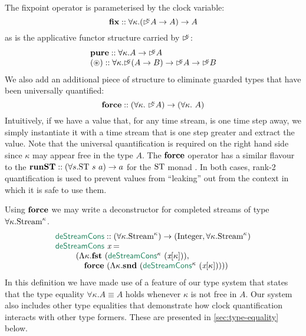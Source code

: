 The fixpoint operator is parameterised by the clock variable:
\begin{displaymath}
  \textbf{fix} :: \forall \kappa. (\mathord{\rhd\kern-0.4em^{\kappa}} A \to A) \to A
\end{displaymath}
as is the applicative functor structure carried by $\mathord{\rhd\kern-0.4em^{\kappa}}$:
\begin{displaymath}
  \begin{array}{l}
    \textbf{pure} :: \forall \kappa. A \to \mathord{\rhd\kern-0.4em^{\kappa}} A \\
    \textbf{$(\circledast)$} :: \forall \kappa. \mathord{\rhd\kern-0.4em^{\kappa}} (A \to B) \to \mathord{\rhd\kern-0.4em^{\kappa}} A \to \mathord{\rhd\kern-0.4em^{\kappa}} B
  \end{array}
\end{displaymath}
We also add an additional piece of structure to eliminate guarded
types that have been universally quantified:
\begin{displaymath}
  \textbf{force} :: (\forall \kappa.\ \mathord{\rhd\kern-0.4em^{\kappa}} A) \to (\forall \kappa.\ A)
\end{displaymath}
Intuitively, if we have a value that, for any time stream, is one time
step away, we simply instantiate it with a time stream that is one
step greater and extract the value. Note that the universal
quantification is required on the right hand side since $\kappa$ may
appear free in the type $A$. The $\textbf{force}$ operator has a similar
flavour to the $\textbf{runST} :: (\forall s. \textrm{ST}\ s\ a) \to a$
for the $\textrm{ST}$ monad
\cite{DBLP:journals/jfp/MoggiS01,launchbury-spj-FIXME}. In both cases,
rank-2 quantification is used to prevent values from ``leaking'' out
from the context in which it is safe to use them.

Using $\textbf{force}$ we may write a deconstructor for completed streams
of type $\forall \kappa. \textrm{Stream}^\kappa$.
\begin{displaymath}
  \begin{array}{l}
    \elim{deStreamCons} :: (\forall \kappa. \tyname{Stream}^\kappa) \to (\tyname{Integer}, \forall \kappa. \tyname{Stream}^\kappa) \\
    \elim{deStreamCons}\ \ident{x} = \\
    \quad\quad
    \begin{array}[t]{l}
      (\Lambda \kappa. \kw{fst}\ (\elim{deStreamCons}^\kappa\ (\ident{x}[\kappa])),\\
      \quad\kw{force}\ (\Lambda \kappa. \kw{snd}\ (\elim{deStreamCons}^\kappa\ (\ident{x}[\kappa]))))
    \end{array}
  \end{array}
\end{displaymath}
In this definition we have made use of a feature of our type system
that states that the type equality $\forall \kappa. A \equiv A$ holds
whenever $\kappa$ is not free in $A$. Our system also includes other
type equalities that demonstrate how clock quantification interacts
with other type formers. These are presented in
\autoref{sec:type-equality} below.

